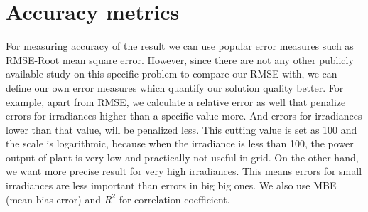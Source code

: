 \section{Accuracy metrics}
For measuring accuracy of the result we can use popular error measures such as RMSE-Root mean square error. However, since there are not any other publicly available study on this specific problem to compare our RMSE with, we can define our own error measures which quantify our solution quality better. For example, apart from RMSE, we calculate a relative error as well that penalize errors for irradiances higher than a specific value more. And errors for irradiances lower than that value, will be penalized less. This cutting value is set as 100 and the scale is logarithmic, because when the irradiance is less than 100, the power output of plant is very low and practically not useful in grid. On the other hand, we want more precise result for very high irradiances. This means errors for small irradiances are less important than errors in big big ones. We also use MBE (mean bias error) and $R^2$ for correlation coefficient.


